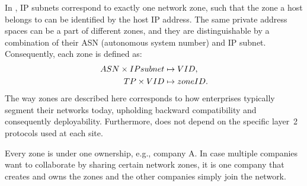 In \name, IP subnets correspond to exactly one network zone, such that the zone
a host belongs to can be identified by the host IP address. The same private
address spaces can be a part of different zones, and they are distinguishable by a
combination of their ASN (autonomous system number) and IP subnet. 
Consequently, each zone is defined as:
\noindent 
\begin{subequations}
	\begin{align}
		ASN \times IPsubnet & \mapsto VID,    \\
		TP \times VID      & \mapsto zoneID. 
	\end{align}
	\label{eq:zoning}
\end{subequations}
\noindent 
The way zones are described here corresponds to how enterprises typically
segment their networks today, upholding backward compatibility and consequently
deployability. Furthermore, \name does not depend on the specific layer~2 protocols used 
at each site. 

Every zone is under one ownership, e.g., company A. In case multiple companies
want to collaborate by sharing certain network zones, it is one company that 
creates and owns the zones and the other companies simply join the network.

